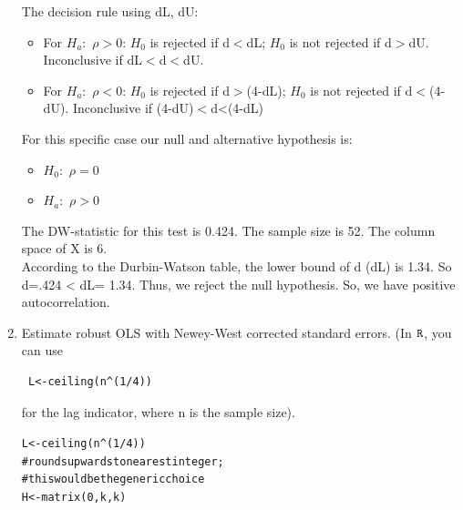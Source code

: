\documentclass[11pt,reqno]{amsart}\usepackage[]{graphicx}\usepackage[]{color}
\makeatletter
\newcommand{\hlnum}[1]{\textcolor[rgb]{0.063,0.58,0.627}{#1}}%
\newcommand{\hlcom}[1]{\textcolor[rgb]{0.588,0.588,0.588}{#1}}%
\newcommand{\hlopt}[1]{\textcolor[rgb]{0.196,0.196,0.196}{#1}}%
\newcommand{\hlstd}[1]{\textcolor[rgb]{0.196,0.196,0.196}{#1}}%
\newcommand{\hlkwb}[1]{\textcolor[rgb]{0.627,0,0.314}{#1}}%
\newcommand{\hlkwd}[1]{\textcolor[rgb]{0.78,0.227,0.412}{#1}}%
\newenvironment{kframe}{%
 \def\at@end@of@kframe{}%
 \ifinner\ifhmode%
  \def\at@end@of@kframe{\end{minipage}}%
  \begin{minipage}{\columnwidth}%
 \fi\fi%
 \def\FrameCommand##1{\hskip\@totalleftmargin \hskip-\fboxsep
 \colorbox{shadecolor}{##1}\hskip-\fboxsep
     \hskip-\linewidth \hskip-\@totalleftmargin \hskip\columnwidth}%
 \MakeFramed {\advance\hsize-\width
   \@totalleftmargin\z@ \linewidth\hsize
   \@setminipage}}%
 {\par\unskip\endMakeFramed%
 \at@end@of@kframe}
\newcommand{\kR}{\tt R\rm{} }%
\newcommand{\ksp}{\vspace{0.1in}}   %
\makeatother
\begin{document}
\begin{enumerate}
The decision rule using dL, dU:
\begin{itemize}
\item For $H_a:$ $\rho > 0$: $H_0$ is rejected if d$<$dL; $H_0$ is not rejected if d$>$dU. Inconclusive if dL$<$d$<$dU.

\item For $H_a:$ $\rho < 0$: $H_0$ is rejected if d$>$(4-dL); $H_0$ is not rejected if d$<$(4-dU). Inconclusive if (4-dU)$<$d<(4-dL)\\
\end{itemize}

For this specific case our null and alternative hypothesis is:
\begin{itemize}
\item $H_0:$ $\rho = 0$\\
\item $H_a:$ $\rho > 0$\\
\end{itemize}

The DW-statistic for this test is 0.424.
The sample size is 52.
The column space of X is 6.\\

According to the Durbin-Watson table, the lower bound of d (dL) is 1.34. So d=.424 < dL= 1.34. Thus, we reject the null hypothesis. So, we have positive autocorrelation.\\

\ksp
\ksp

\item
Estimate robust OLS with  Newey-West corrected standard errors. (In $\kR$, you can use 
\begin{verbatim} L<-ceiling(n^(1/4)) \end{verbatim} for the lag indicator, where n is the sample size).\\

\begin{kframe}
\begin{alltt}
\hlstd{L} \hlkwb{<-} \hlkwd{ceiling}\hlstd{(n} \hlopt{^} \hlstd{(}\hlnum{1} \hlopt{/} \hlnum{4}\hlstd{))}
\hlcom{# rounds upwards to nearest integer;}
\hlcom{# this would be the generic choice}
\hlstd{H} \hlkwb{<-} \hlkwd{matrix}\hlstd{(}\hlnum{0}\hlstd{, k, k)}


\end{alltt}
\end{kframe}
\end{enumerate}
\end{document}
